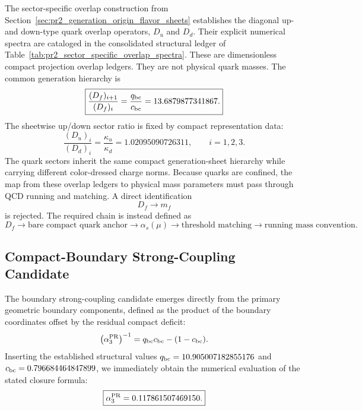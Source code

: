 \documentclass[11pt]{article}
\begin{document}
The sector-specific overlap construction from Section~\ref{sec:pr2_generation_origin_flavor_sheets} establishes the diagonal up- and down-type quark overlap operators, \(D_u\) and \(D_d\). Their explicit numerical spectra are cataloged in the consolidated structural ledger of Table~\ref{tab:pr2_sector_specific_overlap_spectra}.
These are dimensionless compact projection overlap ledgers. 
They are not physical quark masses. 
The common generation hierarchy is
\begin{equation}
\boxed{
\frac{(D_f)_{i+1}}{(D_f)_i}
=
\frac{q_{\rm bc}}{c_{\rm bc}}
=
13.6879877341867.
}
\end{equation}
The sheetwise up/down sector ratio is fixed by compact representation data:
\begin{equation}
\boxed{
\frac{(D_u)_i}{(D_d)_i}
=
\frac{\kappa_u}{\kappa_d}
=
1.02095090726311,
\qquad
i=1,2,3.
}
\end{equation}
The quark sectors inherit the same compact generation-sheet hierarchy while carrying different color-dressed charge norms. Because quarks are confined, the map from these overlap ledgers to physical mass parameters must pass through QCD running and matching. A direct identification
\begin{equation}
D_f
\rightarrow
m_f
\end{equation}
is rejected. The required chain is instead defined as
\begin{equation}
\boxed{
D_f
\rightarrow
\text{bare compact quark anchor}
\rightarrow
\alpha_s(\mu)
\rightarrow
\text{threshold matching}
\rightarrow
\text{running mass convention}.
}
\end{equation}

\subsection{Compact-Boundary Strong-Coupling Candidate}
\label{sec:pr2_compact_boundary_strong_coupling_candidate}

The boundary strong-coupling candidate emerges directly from the primary geometric boundary components, defined as the product of the boundary coordinates offset by the residual compact deficit:
\begin{equation}
\left(
\alpha_3^{\rm PR}
\right)^{-1}
=
q_{\rm bc}c_{\rm bc}
-
(1-c_{\rm bc}).
\end{equation}
Inserting the established structural values \(q_{\rm bc} = 10.905007182855176\) and \(c_{\rm bc} = 0.796684464847899\), we immediately obtain the numerical evaluation of the stated closure formula:
\begin{equation}
\boxed{
\alpha_3^{\rm PR}
=
0.117861507469150.
}
\end{equation}
\end{document}
